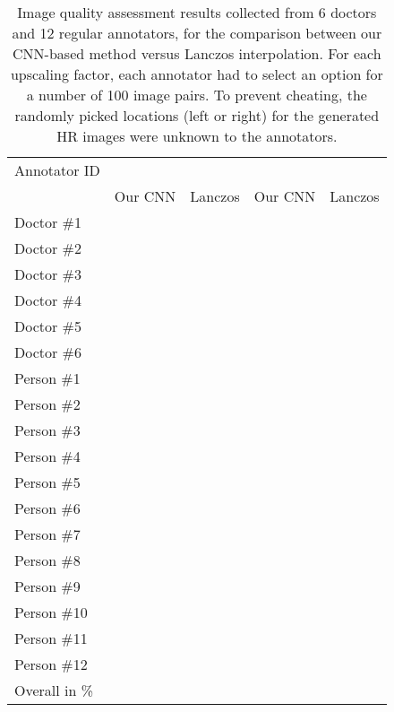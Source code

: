 \documentclass{ieeeaccess}
\begin{document}
\begin{table}[!t]
\caption{Image quality assessment results collected from 6 doctors and 12 regular annotators, for the comparison between our CNN-based method versus Lanczos interpolation. For each upscaling factor, each annotator had to select an option for a number of 100 image pairs. To prevent cheating, the randomly picked locations (left or right) for the generated HR images were unknown to the annotators.}\label{tab_human}
\begin{center}
\begin{tabular}{|l|c|c|c|c|}
\hline 
Annotator ID  & \multicolumn{2}{|c|}{} & \multicolumn{2}{|c|}{} \\
\cline{2-5}   & Our CNN           & Lanczos           & Our CNN           & Lanczos \\
\hline   
\hline
Doctor {\#}1          &  &  &  & \\ 
\hline  
Doctor {\#}2          &  &  &  & \\   
\hline 
Doctor {\#}3          &  &  &  & \\  
\hline  
Doctor {\#}4          &  &  &  & \\ 
\hline  
Doctor {\#}5          &  &  &  & \\ 
\hline  
Doctor {\#}6          &  &  &  & \\  
\hline
Person {\#}1          &  &  &  & \\ 
\hline  
Person {\#}2          &  &  &  & \\ 
\hline  
Person {\#}3          &  &  &  & \\ 
\hline  
Person {\#}4          &  &  &  & \\   
\hline 
Person {\#}5          &  &  &  & \\  
\hline   
Person {\#}6          &  &  &  & \\ 
\hline  
Person {\#}7          &  &  &  & \\ 
\hline  
Person {\#}8          &  &  &  & \\ 
\hline  
Person {\#}9          &  &  &  & \\   
\hline 
Person {\#}10         &  &  &  & \\  
\hline 
Person {\#}11         &  &  &  & \\ 
\hline  
Person {\#}12         &  &  &  & \\ 
\hline  
Overall in \%         &  &  &  & \\
\hline 
\end{tabular}
\end{center}
\end{table}
\end{document}
